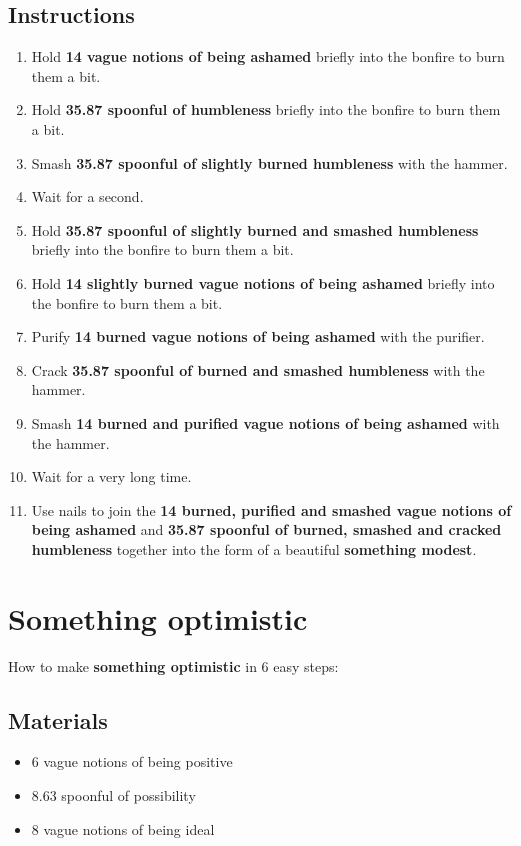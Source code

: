 \documentclass{article}
\begin{document}
\subsection{Instructions}\begin{enumerate}
\item 
Hold \textbf{14 vague notions of being ashamed} briefly into the bonfire to burn them a bit.
\item 
Hold \textbf{35.87 spoonful of humbleness} briefly into the bonfire to burn them a bit.
\item 
Smash \textbf{35.87 spoonful of slightly burned humbleness} with the hammer.
\item 
Wait for a second.
\item 
Hold \textbf{35.87 spoonful of slightly burned and smashed humbleness} briefly into the bonfire to burn them a bit.
\item 
Hold \textbf{14 slightly burned vague notions of being ashamed} briefly into the bonfire to burn them a bit.
\item 
Purify \textbf{14 burned vague notions of being ashamed} with the purifier.
\item 
Crack \textbf{35.87 spoonful of burned and smashed humbleness} with the hammer.
\item 
Smash \textbf{14 burned and purified vague notions of being ashamed} with the hammer.
\item 
Wait for a very long time.
\item 
Use nails to join the \textbf{14 burned, purified and smashed vague notions of being ashamed} and \textbf{35.87 spoonful of burned, smashed and cracked humbleness} together into the form of a beautiful \textbf{something modest}.
\end{enumerate}
\newpage
\section{Something optimistic}How to make \textbf{something optimistic} in 6 easy steps:

\subsection{Materials}\begin{itemize}
\item 
6 vague notions of being positive
\item 
8.63 spoonful of possibility
\item 
8 vague notions of being ideal
\end{itemize}
\end{document}
